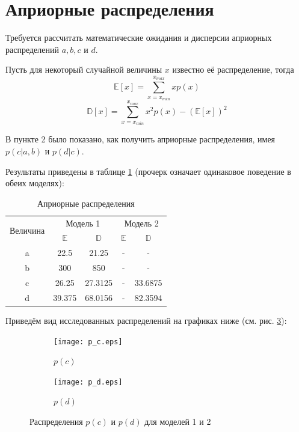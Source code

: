 \documentclass[12pt,a4paper,oneside,fleqn,leqno]{article}
\begin{document}
		\section{Априорные распределения}
			Требуется рассчитать математические ожидания и дисперсии априорных распределений $a, b, c$ и $d$.\par
			Пусть для некоторый случайной величины $x$ известно её распределение, тогда
			$$ \mathbb{E}[x] = \sum_{x = x_{min}}^{x_{max}}xp(x)$$
			$$ \mathbb{D}[x] = \sum_{x = x_{min}}^{x_{max}}x^2p(x) - (\mathbb{E}[x])^2$$\par
			В пункте 2 было показано, как получить априорные распределения, имея $p(c|a,b)$ и $p(d|c).$\par
			Результаты приведены в таблице \ref{tab:aprior} (прочерк означает одинаковое поведение в обеих моделях):
			\begin{table}[H]
			\centering
			\begin{tabular}{|c|c|c|c|c|}
				\hline
				\multirow{2}{*}{Величина} & \multicolumn{2}{c|}{Модель 1} & \multicolumn{2}{c|}{Модель 2}\\
				\cline{2-5}
				 & $\mathbb{E}$ & $\mathbb{D}$ & $\mathbb{E}$ & $\mathbb{D}$\\
				\hline
				a & 22.5 & 21.25 & - & -\\
				\hline
				b & 300 & 850 & - & -\\
				\hline
				c & 26.25 & 27.3125 & - & 33.6875\\
				\hline
				d & 39.375 & 68.0156 & - & 82.3594\\
				\hline
				\end{tabular}
			\caption{Априорные распределения}
			\label{tab:aprior}
		\end{table}\par
		Приведём вид исследованных распределений на графиках ниже (см. рис. \ref{fig:bla}):
			\begin{figure}[H]
				\begin{subfigure}[b]{0.5\textwidth}
					\centering
					\texttt{[image: p\_c.eps]}
					\caption{$p(c)$}
					\label{fig:distr_c}
				\end{subfigure}
				\begin{subfigure}[b]{0.5\textwidth}
					\centering
					\texttt{[image: p\_d.eps]}
					\caption{$p(d)$}
					\label{fig:distr_d}
				\end{subfigure}
				\captionsetup{justification=centering}
				\caption{Распределения $p(c)$ и $p(d)$ для моделей 1 и 2}
				\label{fig:bla}
			\end{figure}
\end{document}
